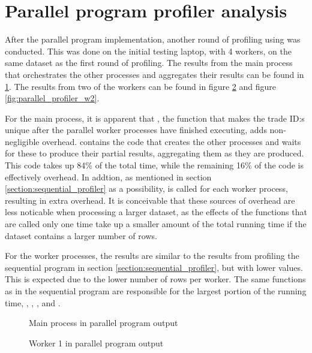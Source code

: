\section{Parallel program profiler analysis}
After the parallel program implementation, another round of profiling using  was conducted. This was done on the initial testing laptop,
with 4 workers, on the same dataset as the first round of profiling. The results from the main process that orchestrates the other processes and aggregates their results can be
found in \ref{fig:parallel_profiler_main}. The results from two of the workers can be found in figure \ref{fig:parallel_profiler_w1} and figure \ref{fig:parallel_profiler_w2}.

For the main process, it is apparent that , the function that makes the trade ID:s unique after the parallel worker processes have finished
executing, adds non-negligible overhead.  contains the code that creates the other processes and waits for these to produce their partial results,
aggregating them as they are produced. This code takes up 84\% of the total time, while the remaining 16\% of the code is effectively overhead.
In addtion, as mentioned in section \ref{section:sequential_profiler} as a possibility,  is called for each
worker process, resulting in extra overhead. It is conceivable that these sources of overhead are less noticable when processing a larger dataset, as the effects of
the functions that are called only one time take up a smaller amount of the total running time if the dataset contains a larger number of rows.

For the worker processes, the results are similar to the results from profiling the sequential program in section \ref{section:sequential_profiler}, but with lower
 values. This is expected due to the lower number of rows per worker. The same functions as in the sequential program are responsible for the largest
portion of the running time, , , , and .

\begin{figure}[ht]
  
  \caption{Main process in parallel program  output}
  \label{fig:parallel_profiler_main}
\end{figure}
\clearpage

\begin{figure}[ht]
  
  \caption{Worker 1 in parallel program  output}
  \label{fig:parallel_profiler_w1}
\end{figure}
\clearpage

